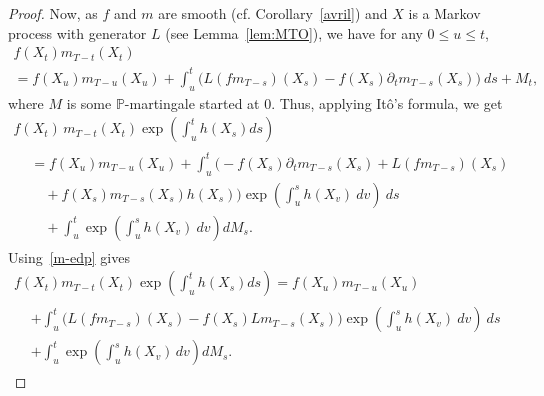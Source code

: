 \documentclass[10pt]{amsart}
\theoremstyle{definition}\newtheorem{defi}[theo]{Definition}\newtheorem{rema}[theo]{Remark}\newtheorem{exam}[theo]{Example}\newtheorem{exem}[theo]{Example}\newtheorem{nota}[theo]{Notation}
\renewcommand*\P{\mathbb{P}}
\begin{document}
\begin{proof}

\noindent Now, as $f$ and $m$ are smooth (cf. Corollary~\ref{avril}) and $X$ is a Markov process with generator $L$ (see Lemma~\ref{lem:MTO}), we have for any $0\le u\le t$,
\begin{multline}\label{eq:thmeq2}
f\left(X_{t}\right)m_{T-t}\left(X_{t}\right)\\
=f\left(X_{u}\right)m_{T-u}\left(X_{u}\right)+\int_{u}^{t} \big(L\left(fm_{T-s}\right)\left(X_{s}\right) -f\left(X_{s}\right)\partial_{t}m_{T-s}\left(X_{s}\right)\big)\ ds+M_{t},
\end{multline}
where $M$ is some $\P$-martingale started at $0$. Thus, applying It\^o's formula, we get
\begin{multline*}
f\left(X_{t}\right)\, m_{T-t}\left(X_{t}\right)\exp\left(\int_{u}^{t}h\left(X_{s}\right)ds \right)\\
\begin{aligned}
&=f\left(X_{u}\right)m_{T-u}\left(X_{u}\right)+\int_{u}^{t}\Big(- f\left(X_{s}\right)\partial_{t}m_{T-s}\left(X_{s}\right)+L\left(fm_{T-s}\right)\left(X_{s}\right)\\
&\quad+f\left(X_{s}\right)m_{T-s}\left(X_{s}\right)h\left(X_{s}\right)\Big) \exp\left(\int_{u}^{s}h\left(X_{v}\right)\ dv \right)\ ds\\
&\quad+\int_{u}^{t}\exp\left(\int_{u}^{s}h\left(X_{v}\right)\ dv \right) dM_{s}.
\end{aligned}
\end{multline*}
Using~\eqref{m-edp} gives
\begin{multline*}
f\left(X_{t}\right)m_{T-t}\left(X_{t}\right)\exp\left(\int_{u}^{t}h\left(X_{s}\right)ds \right) =f\left(X_{u}\right)m_{T-u}\left(X_{u}\right)\\
\begin{aligned}
&+\int_{u}^{t}\big(L\left(fm_{T-s}\right)\left(X_{s}\right)-f\left(X_{s}\right)Lm_{T-s}\left(X_{s}\right)\big) \exp\left(\int_{u}^{s}h\left(X_{v}\right)\ dv \right)\ ds\\
&+\int_{u}^{t}\exp\left(\int_{u}^{s}h\left(X_{v}\right)\, dv \right) dM_{s}.
\end{aligned}
\end{multline*} 


\end{proof}
\end{document}
